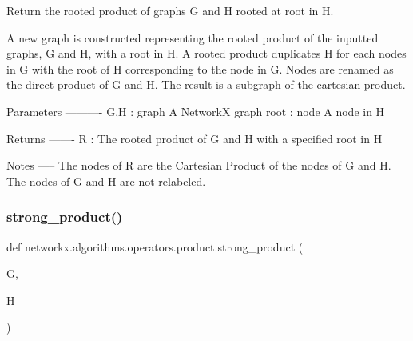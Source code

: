 \begin{DoxyVerb}Return the rooted product of graphs G and H rooted at root in H.

A new graph is constructed representing the rooted product of
the inputted graphs, G and H, with a root in H.
A rooted product duplicates H for each nodes in G with the root
of H corresponding to the node in G. Nodes are renamed as the direct
product of G and H. The result is a subgraph of the cartesian product.

Parameters
----------
G,H : graph
   A NetworkX graph
root : node
   A node in H

Returns
-------
R : The rooted product of G and H with a specified root in H

Notes
-----
The nodes of R are the Cartesian Product of the nodes of G and H.
The nodes of G and H are not relabeled.
\end{DoxyVerb}
 \mbox{\label{namespacenetworkx_1_1algorithms_1_1operators_1_1product_ac2fd96ada7b316ecd585222820e25734}} 
\subsubsection{\texorpdfstring{strong\+\_\+product()}{strong\_product()}}
{\footnotesize\ttfamily def networkx.\+algorithms.\+operators.\+product.\+strong\+\_\+product (\begin{DoxyParamCaption}\item[{}]{G,  }\item[{}]{H }\end{DoxyParamCaption})}

